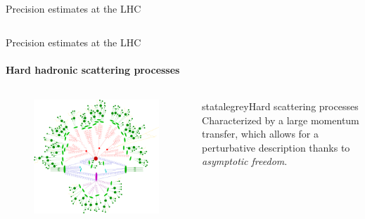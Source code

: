 \begin{frame}{Precision estimates at the LHC}
\begin{columns}
\begin{column}{0.5\textwidth}
    \end{column}

  \end{columns}

\end{frame}


\begin{frame}{Precision estimates at the LHC}
  \framesubtitle{Hard hadronic scattering processes}

  \begin{columns}

    \begin{column}{0.5 \textwidth}

      \begin{figure}
        \centering
        \includegraphics[width = \textwidth]{../imgs/hadr-scatt.pdf}
      \end{figure}

    \end{column}

    \begin{column}{0.5 \textwidth}

      \begin{colorblock}[black]{statalegrey}{Hard scattering processes}
        \justifying
        Characterized by a large momentum transfer, which allows for a perturbative description thanks to \emph{asymptotic freedom}.


\end{colorblock}
\end{column}
\end{columns}
\end{frame}
